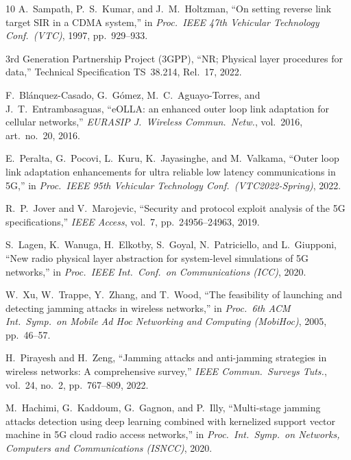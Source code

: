 \documentclass[conference]{IEEEtran}
\begin{document}
\begin{thebibliography}{10}
A.~Sampath, P.~S.~Kumar, and J.~M.~Holtzman,
``On setting reverse link target SIR in a CDMA system,''
in \emph{Proc.\ IEEE 47th Vehicular Technology Conf.\ (VTC)}, 1997, pp.~929--933.

3rd Generation Partnership Project (3GPP),
``NR; Physical layer procedures for data,''
Technical Specification TS~38.214, Rel.~17, 2022.

F.~Bl\'anquez-Casado, G.~G\'omez, M.~C.~Aguayo-Torres, and J.~T.~Entrambasaguas,
``eOLLA: an enhanced outer loop link adaptation for cellular networks,''
\emph{EURASIP J.\ Wireless Commun.\ Netw.}, vol.~2016, art.\ no.~20, 2016.

E.~Peralta, G.~Pocovi, L.~Kuru, K.~Jayasinghe, and M.~Valkama,
``Outer loop link adaptation enhancements for ultra reliable low latency communications in 5G,''
in \emph{Proc.\ IEEE 95th Vehicular Technology Conf.\ (VTC2022-Spring)}, 2022.

R.~P.~Jover and V.~Marojevic,
``Security and protocol exploit analysis of the 5G specifications,''
\emph{IEEE Access}, vol.~7, pp.~24956--24963, 2019.

S.~Lagen, K.~Wanuga, H.~Elkotby, S.~Goyal, N.~Patriciello, and L.~Giupponi,
``New radio physical layer abstraction for system-level simulations of 5G networks,''
in \emph{Proc.\ IEEE Int.\ Conf.\ on Communications (ICC)}, 2020.

W.~Xu, W.~Trappe, Y.~Zhang, and T.~Wood,
``The feasibility of launching and detecting jamming attacks in wireless networks,''
in \emph{Proc.\ 6th ACM Int.\ Symp.\ on Mobile Ad Hoc Networking and Computing (MobiHoc)}, 2005, pp.~46--57.

H.~Pirayesh and H.~Zeng,
``Jamming attacks and anti-jamming strategies in wireless networks: A comprehensive survey,''
\emph{IEEE Commun.\ Surveys Tuts.}, vol.~24, no.~2, pp.~767--809, 2022.

M.~Hachimi, G.~Kaddoum, G.~Gagnon, and P.~Illy,
``Multi-stage jamming attacks detection using deep learning combined with kernelized support vector machine in 5G cloud radio access networks,''
in \emph{Proc.\ Int.\ Symp.\ on Networks, Computers and Communications (ISNCC)}, 2020.
\end{thebibliography}
\end{document}
